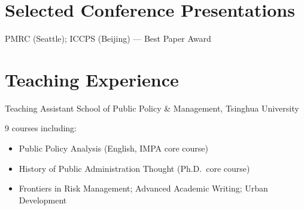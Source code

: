 \documentclass[11pt, a4paper]{moderncv}
\begin{document}
\section{Selected Conference Presentations}



  {PMRC (Seattle); ICCPS (Beijing) --- Best Paper Award}
  {}
  {}
  {}
  {}






\section{Teaching Experience}

  {Teaching Assistant}
  {School of Public Policy \& Management, Tsinghua University}
  {}
  {}
  {
    9 courses including:
    \begin{itemize}
      \item Public Policy Analysis (English, IMPA core course)
      \item History of Public Administration Thought (Ph.D.\ core course)
      \item Frontiers in Risk Management; Advanced Academic Writing; Urban Development
    \end{itemize}
  }

\end{document}
